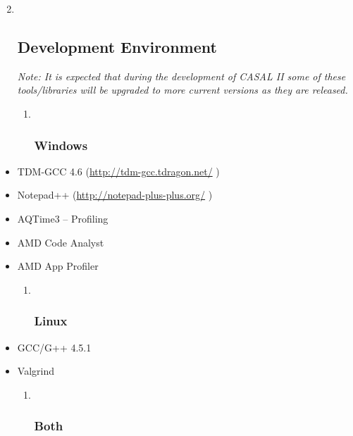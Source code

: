 \documentclass[a4paper,11pt,twoside,pdftex,draft]{article}
\begin{document}
\begin{enumerate}
\setcounter{enumi}{1}
\item ~
  \hypertarget{development-environment}{%
  \subsection{Development Environment}\label{development-environment}}

  \emph{Note: It is expected that during the development of CASAL II
  some of these tools/libraries will be upgraded to more current
  versions as they are released.}

  \begin{enumerate}
  \item ~
    \hypertarget{windows}{%
    \subsubsection{Windows}\label{windows}}
  \end{enumerate}
\end{enumerate}

\begin{itemize}
\item
  TDM-GCC 4.6
  (\href{http://tdm-gcc.tdragon.net/}{{http://tdm-gcc.tdragon.net/}} )
\item
  Notepad++
  (\href{http://notepad-plus-plus.org/}{{http://notepad-plus-plus.org/}}
  )
\item
  AQTime3 -- Profiling
\item
  AMD Code Analyst
\item
  AMD App Profiler

  \begin{enumerate}
  \item ~
    \hypertarget{linux}{%
    \subsubsection{Linux}\label{linux}}
  \end{enumerate}
\end{itemize}

\begin{itemize}
\item
  GCC/G++ 4.5.1
\item
  Valgrind

  \begin{enumerate}
  \item ~
    \hypertarget{both}{%
    \subsubsection{Both}\label{both}}
  \end{enumerate}
\end{itemize}
\end{document}

